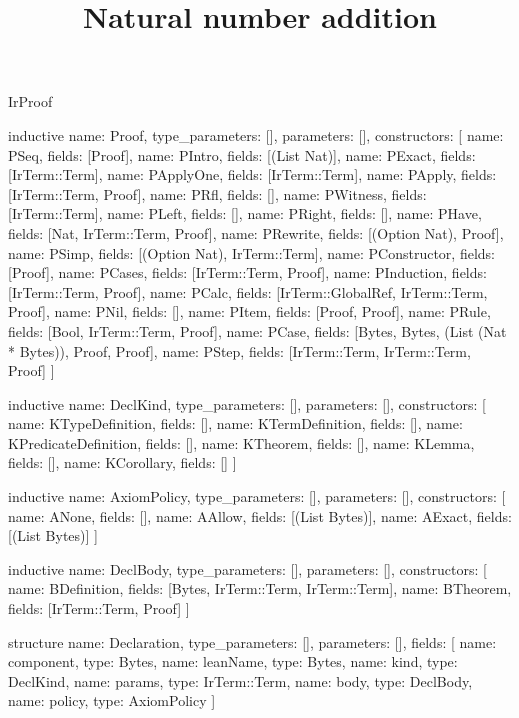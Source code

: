 \begin{lexlean}{IrProof}
\title{Natural number addition}
\begin{semanticmodule}
inductive{
  name: Proof,
  type_parameters: [],
  parameters: [],
  constructors: [
    {name: PSeq, fields: [Proof]},
    {name: PIntro, fields: [(List Nat)]},
    {name: PExact, fields: [IrTerm::Term]},
    {name: PApplyOne, fields: [IrTerm::Term]},
    {name: PApply, fields: [IrTerm::Term, Proof]},
    {name: PRfl, fields: []},
    {name: PWitness, fields: [IrTerm::Term]},
    {name: PLeft, fields: []},
    {name: PRight, fields: []},
    {name: PHave, fields: [Nat, IrTerm::Term, Proof]},
    {name: PRewrite, fields: [(Option Nat), Proof]},
    {name: PSimp, fields: [(Option Nat), IrTerm::Term]},
    {name: PConstructor, fields: [Proof]},
    {name: PCases, fields: [IrTerm::Term, Proof]},
    {name: PInduction, fields: [IrTerm::Term, Proof]},
    {name: PCalc, fields: [IrTerm::GlobalRef, IrTerm::Term, Proof]},
    {name: PNil, fields: []},
    {name: PItem, fields: [Proof, Proof]},
    {name: PRule, fields: [Bool, IrTerm::Term, Proof]},
    {name: PCase, fields: [Bytes, Bytes, (List (Nat * Bytes)), Proof, Proof]},
    {name: PStep, fields: [IrTerm::Term, IrTerm::Term, Proof]}
  ]
}

inductive{
  name: DeclKind,
  type_parameters: [],
  parameters: [],
  constructors: [
    {name: KTypeDefinition, fields: []},
    {name: KTermDefinition, fields: []},
    {name: KPredicateDefinition, fields: []},
    {name: KTheorem, fields: []},
    {name: KLemma, fields: []},
    {name: KCorollary, fields: []}
  ]
}

inductive{
  name: AxiomPolicy,
  type_parameters: [],
  parameters: [],
  constructors: [
    {name: ANone, fields: []},
    {name: AAllow, fields: [(List Bytes)]},
    {name: AExact, fields: [(List Bytes)]}
  ]
}

inductive{
  name: DeclBody,
  type_parameters: [],
  parameters: [],
  constructors: [
    {name: BDefinition, fields: [Bytes, IrTerm::Term, IrTerm::Term]},
    {name: BTheorem, fields: [IrTerm::Term, Proof]}
  ]
}

structure{
  name: Declaration,
  type_parameters: [],
  parameters: [],
  fields: [
    {name: component, type: Bytes},
    {name: leanName, type: Bytes},
    {name: kind, type: DeclKind},
    {name: params, type: IrTerm::Term},
    {name: body, type: DeclBody},
    {name: policy, type: AxiomPolicy}
  ]
}


\end{semanticmodule}
\end{lexlean}
